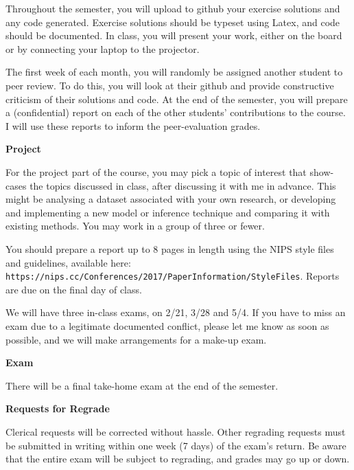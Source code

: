 \documentclass[11pt]{article}
\begin{document}
Throughout the semester, you will upload to github your exercise solutions and any code generated. Exercise solutions should be typeset using Latex, and code should be documented. In class, you will present your work, either on the board or by connecting your laptop to the projector.

The first week of each month, you will randomly be assigned another student to peer review. To do this, you will look at their github and provide constructive criticism of their solutions and code. At the end of the semester, you will prepare a (confidential) report on each of the other students' contributions to the course. I will use these reports to inform the peer-evaluation grades.


\textbf{Project}

For the project part of the course, you may pick a topic of interest that show-cases the topics discussed in class, after discussing it with me in advance. This might be analysing a dataset associated with your own research, or developing and implementing a new model or inference technique and comparing it with existing methods. You may work in a group of three or fewer. 

You should prepare a report up to 8 pages in length using the NIPS style files and guidelines, available here: \texttt{https://nips.cc/Conferences/2017/PaperInformation/StyleFiles}. Reports are due on the final day of class.

We will have three in-class exams, on 2/21, 3/28 and 5/4. If you have to miss an exam due to a legitimate documented conflict, please let me know as soon as possible, and we will make arrangements for a make-up exam. 



\textbf{Exam}

There will be a final take-home exam at the end of the semester.



\vspace{5mm}

\textbf {\large Requests for Regrade}

Clerical requests will be corrected without hassle. Other regrading requests must be submitted in writing within one week (7 days) of the exam's return. Be aware that the entire exam will be subject to regrading, and grades may go up or down.



\end{document}
